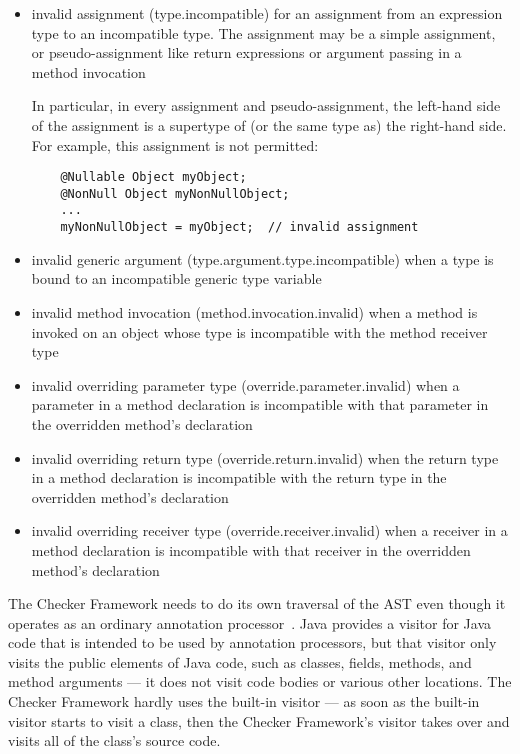 \begin{itemize}

\item invalid assignment (type.incompatible) for an assignment from
  an expression type to an incompatible type.  The assignment may be a
  simple assignment, or pseudo-assignment like return expressions or
  argument passing in a method invocation

  In particular, in every assignment and pseudo-assignment, the
  left-hand side of the assignment is a supertype of (or the same type
  as) the right-hand side.  For example, this assignment is not
  permitted:

  \begin{Verbatim}
    @Nullable Object myObject;
    @NonNull Object myNonNullObject;
    ...
    myNonNullObject = myObject;  // invalid assignment
  \end{Verbatim}

\item invalid generic argument (type.argument.type.incompatible) when a type
  is bound to an incompatible generic type variable

\item invalid method invocation (method.invocation.invalid) when a
  method is invoked on an object whose type is incompatible with the
  method receiver type

\item invalid overriding parameter type (override.parameter.invalid)
  when a parameter in a method declaration is incompatible with that
  parameter in the overridden method's declaration

\item invalid overriding return type (override.return.invalid) when the
  return type in a method declaration is incompatible with the
  return type in the overridden method's declaration

\item invalid overriding receiver type (override.receiver.invalid)
  when a receiver in a method declaration is incompatible with that
  receiver in the overridden method's declaration

\end{itemize}



The Checker Framework needs to do its own traversal of the AST even though
it operates as an ordinary annotation processor~\cite{JSR269}.  Java
provides a visitor for Java code that is intended to be used by annotation
processors, but that visitor only
visits the public elements of Java code, such as classes, fields, methods,
and method arguments --- it does not visit code bodies or various other
locations.  The Checker Framework hardly uses the built-in visitor --- as
soon as the built-in visitor starts to visit a class, then the Checker
Framework's visitor takes over and visits all of the class's source code.

